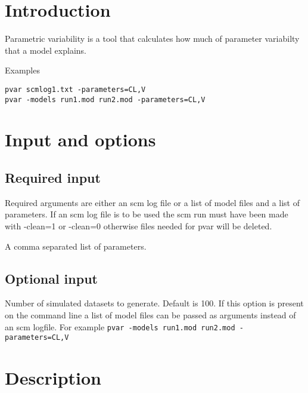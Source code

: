 



\maketitle


\section{Introduction}
Parametric variability is a tool that calculates how much of parameter variabilty that a model explains.

Examples
\begin{verbatim}
pvar scmlog1.txt -parameters=CL,V
pvar -models run1.mod run2.mod -parameters=CL,V
\end{verbatim}

\section{Input and options}

\subsection{Required input}
Required arguments are either an scm log file or a list of model files and a list of parameters. If an scm log file is to be used the scm run must have been made with -clean=1 or -clean=0 otherwise files needed for pvar will be deleted.

\begin{optionlist}

A comma separated list of parameters.
\nextopt
\end{optionlist}

\subsection{Optional input}

\begin{optionlist}
Number of simulated datasets to generate. Default is 100.
\nextopt
{}
If this option is present on the command line a list of model files can be passed as arguments instead of an scm logfile. For example \verb|pvar -models run1.mod run2.mod -parameters=CL,V|
\end{optionlist}

\section{Description}

